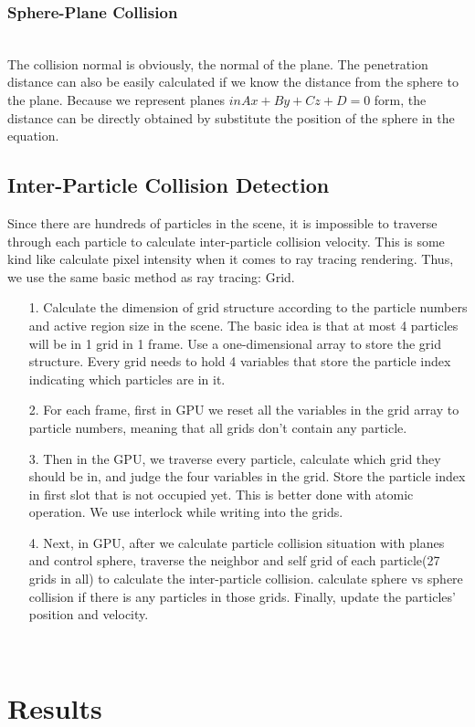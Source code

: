 \documentclass[acmtog]{acmart}
\begin{document}
\subsubsection{Sphere-Plane Collision}
\quad \\
The collision normal is obviously, the normal of the plane. The penetration distance can also be easily calculated if we know the distance from the sphere to the plane. Because we represent planes $in Ax+By+Cz+D = 0$ form, the distance can be directly obtained by substitute the position of the sphere in the equation.
\subsection{Inter-Particle Collision Detection}
Since there are hundreds of particles in the scene, it is impossible to traverse through each particle to calculate inter-particle collision velocity. This is some kind like calculate pixel intensity when it comes to ray tracing rendering. Thus, we use the same basic method as ray tracing: Grid. 
\begin{enumerate}
	\item [1.] Calculate the dimension of grid structure according to the particle numbers and active region size in the scene. The basic idea is that at most 4 particles will be in 1 grid in 1 frame. Use a one-dimensional array to store the grid structure. Every grid needs to hold 4 variables that store the particle index indicating which particles are in it.
	\item [2.] For each frame, first in GPU we reset all the variables in the grid array to particle numbers, meaning that all grids don't contain any particle. 
	\item [3.] Then in the GPU, we traverse every particle, calculate which grid they should be in, and judge the four variables in the grid. Store the particle index in first slot that is not occupied yet. This is better done with atomic operation. We use interlock while writing into the grids.
	\item [4.] Next, in GPU, after we calculate particle collision situation with planes and control sphere, traverse the neighbor and self grid of each particle(27 grids in all) to calculate the inter-particle collision. calculate sphere vs sphere collision if there is any particles in those grids. Finally, update the particles' position and velocity.
\end{enumerate}


\pagebreak
\quad \\

\pagebreak
\section{Results}

\vspace{20mm}
\end{document}
